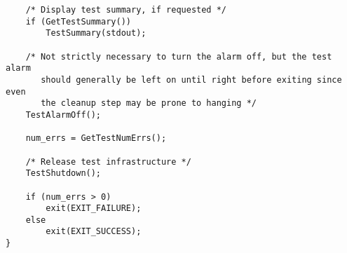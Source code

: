 \documentclass[../HDF5_RFC.tex]{subfiles}
\begin{document}
\begin{verbatim}
    /* Display test summary, if requested */
    if (GetTestSummary())
        TestSummary(stdout);

    /* Not strictly necessary to turn the alarm off, but the test alarm
       should generally be left on until right before exiting since even
       the cleanup step may be prone to hanging */
    TestAlarmOff();

    num_errs = GetTestNumErrs();

    /* Release test infrastructure */
    TestShutdown();

    if (num_errs > 0)
        exit(EXIT_FAILURE);
    else
        exit(EXIT_SUCCESS);
}
\end{verbatim}
\end{document}
